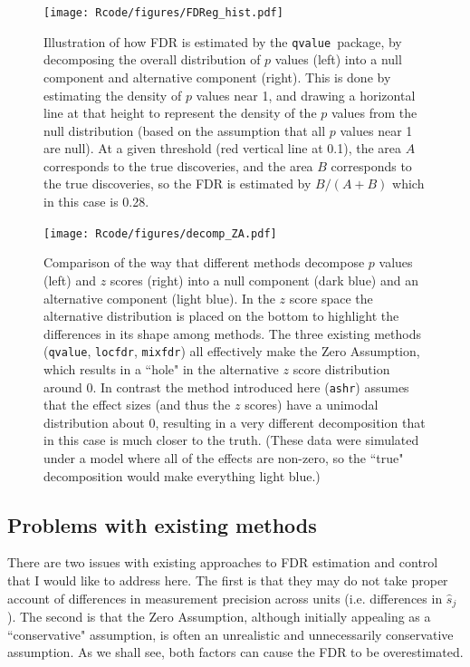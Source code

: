 \documentclass[11pt]{article}
\def\shat{\hat{s}}
\def\qvalue{{\tt qvalue}\xspace}
\def\locfdr{{\tt locfdr}\xspace}
\def\mixfdr{{\tt mixfdr}\xspace}
\def\ashr{{\tt ashr}\xspace}
\begin{document}
\begin{figure}
\texttt{[image: Rcode/figures/FDReg\_hist.pdf]}
\caption{Illustration of how FDR is estimated by the \qvalue \, package, by decomposing the overall distribution of $p$ values (left) into a null component and alternative component (right). This is done by estimating the density of $p$ values near 1, and drawing a horizontal line at that height to represent the density of the $p$ values from the null distribution (based on the assumption that all $p$ values near 1 are null).
At a given threshold (red vertical line at 0.1), the area $A$ corresponds to the true discoveries, and the area $B$ corresponds to the true discoveries,
so the FDR is estimated by $B/(A+B)$ which in this case is 0.28.} \label{fig:qvalue}
\end{figure}

\begin{figure}
\center \texttt{[image: Rcode/figures/decomp\_ZA.pdf]}
\caption{Comparison of the way that different methods decompose $p$ values (left) and $z$ scores (right) into a null component (dark blue) and an alternative component (light blue). In the $z$ score space the alternative distribution is placed on the bottom to highlight the differences in its shape among methods.
The three existing methods (\qvalue, \locfdr, \mixfdr) all effectively make the Zero Assumption, which results in a ``hole" in the alternative $z$ score distribution around 0.
In contrast the method introduced here (\ashr) assumes that the effect sizes (and thus the $z$ scores) have a unimodal distribution about 0, resulting in a very different decomposition that in this case is much closer to the truth. (These data were simulated under a model where all of the effects are non-zero, so the ``true" decomposition would make everything light blue.)} \label{fig:ZA}
\end{figure}




\subsection*{Problems with existing methods}

 There are two issues with existing approaches to FDR estimation and control that I would like to address here. 
 The first is that they may do not take proper account of differences in measurement precision across units (i.e. differences in $\shat_j$). 
 The second is that the Zero Assumption, although initially appealing as a ``conservative" assumption,
  is often an unrealistic and unnecessarily conservative assumption. As we shall see, both factors can cause the FDR to be overestimated.
 
\end{document}
